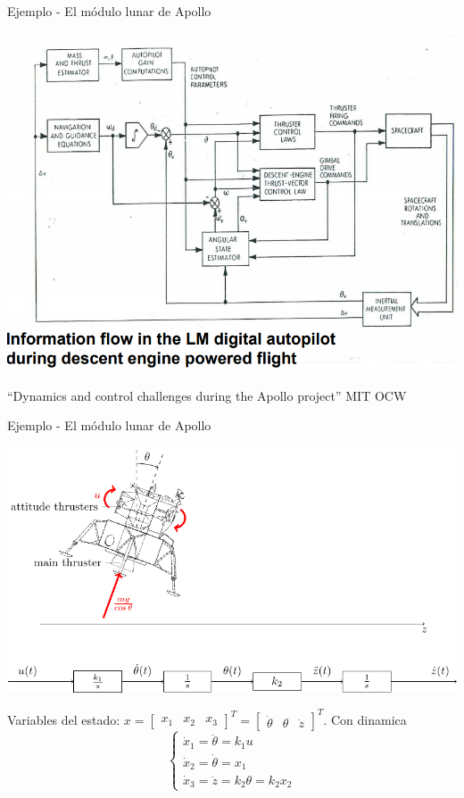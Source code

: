 \documentclass[presentation,aspectratio=1610]{beamer}
\begin{document}
\begin{frame}[label={sec:orgf07bcc9}]{Ejemplo - El módulo lunar de Apollo}
\begin{center}
\includegraphics[width=0.7\linewidth]{../../figures/mit_LM_autopilot.png}
\end{center}
{\footnotesize ``Dynamics and control challenges during the Apollo project'' MIT OCW}
\end{frame}

\begin{frame}[label={sec:orgf3e0637}]{Ejemplo - El módulo lunar de Apollo}
\begin{center}
\includegraphics[width=0.7\linewidth]{fig-apollo}
\end{center}

Variables del estado: \(x = \begin{bmatrix} x_1 & x_2 & x_3 \end{bmatrix}^T = \begin{bmatrix} \dot{\theta} & \theta & \dot{z} \end{bmatrix}^T\). Con dinamica
\[ \begin{cases} \dot{x}_1 =  \ddot{\theta} = k_1 u\\ \dot{x}_2 = \dot{\theta} = x_1\\ \dot{x}_3 = \ddot{z} = k_2\theta = k_2x_2 \end{cases} \]
\end{frame}
\end{document}

